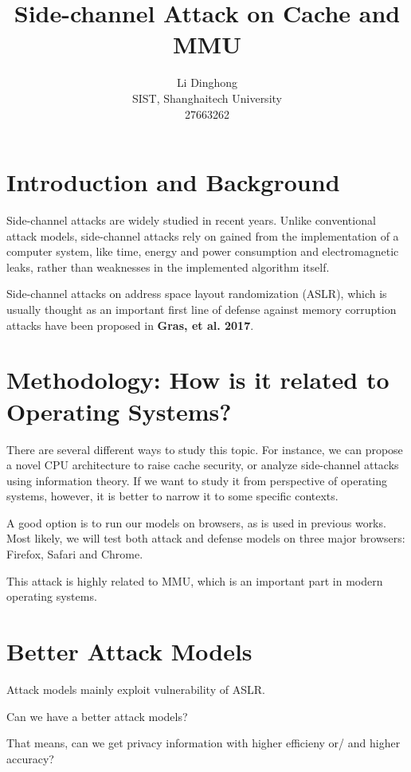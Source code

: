 \documentclass{article}
\title{Side-channel Attack on Cache and MMU}
\author{Li Dinghong \\SIST, Shanghaitech University \\27663262}
\begin{document}
\maketitle
\large

\section{Introduction and Background}{
	Side-channel attacks are widely studied in recent years. Unlike conventional attack models, side-channel attacks rely on gained from the implementation of a computer system, like time, energy and power consumption and electromagnetic leaks, rather than weaknesses in the implemented algorithm itself. 

	Side-channel attacks on address space layout randomization (ASLR), which is usually thought as an important first line of defense against memory corruption attacks have been proposed in \textbf{Gras, et al. 2017}. 
}


\section{Methodology: How is it related to Operating Systems? }{
	There are several different ways to study this topic. For instance, we can propose a novel CPU architecture to raise cache security, or analyze side-channel attacks using information theory. If we want to study it from perspective of operating systems, however, it is better to narrow it to some specific contexts. 

	A good option is to run our models on browsers, as is used in previous works. Most likely, we will test both attack and defense models on three major browsers: Firefox, Safari and Chrome. 

	This attack is highly related to MMU, which is an important part in modern operating systems. 
}

\section{Better Attack Models}{
	Attack models mainly exploit vulnerability of ASLR. 

	Can we have a better attack models? 

	That means, can we get privacy information with higher efficieny or/ and higher accuracy? 
}
\end{document}
